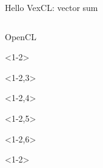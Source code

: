 \documentclass[@BEAMER_OPTIONS@]{beamer}
\begin{document}
\begin{frame}[fragile]{Hello VexCL: vector sum}
    \vspace{-1\baselineskip}
    \begin{columns}
        \begin{column}[t]{0.2\textwidth}
            \begin{exampleblock}{OpenCL}
                \begin{adjustbox}{width=0.19\textwidth, height=\textheight, keepaspectratio}
                    \begin{minipage}{\textwidth}
                        \begin{uncoverenv}<1-2>
                            
                        \end{uncoverenv}
                        \begin{uncoverenv}<1-2,3>
                            
                        \end{uncoverenv}
                        \begin{uncoverenv}<1-2,4>
                            
                        \end{uncoverenv}
                        \begin{uncoverenv}<1-2,5>
                            
                        \end{uncoverenv}
                        \begin{uncoverenv}<1-2,6>
                            
                        \end{uncoverenv}
                        \begin{uncoverenv}<1-2>
                            
                        \end{uncoverenv}
                    \end{minipage}
                \end{adjustbox}
            \end{exampleblock}
        \end{column}

\end{columns}
\end{frame}
\end{document}
